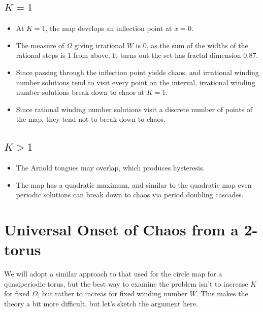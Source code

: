 \documentclass[12pt]{article}
\begin{document}
\subsection{$K = 1$}

\begin{itemize}
    \item At $K = 1$, the map develops an inflection point at $x=0$.

    \item The measure of $\Omega$ giving irrational $W$ is $0$, as the sum of
        the widths of the rational steps is $1$ from above. It turns out the set
        has fractal dimension $0.87$.

    \item Since passing through the inflection point yields chaos, and
        irrational winding number solutions tend to visit every point on the
        interval, irrational winding number solutions break down to chaos at
        $K=1$.

    \item Since rational winding number solutions visit a discrete number of
        points of the map, they tend not to break down to chaos.
\end{itemize}

\subsection{$K > 1$}

\begin{itemize}
    \item The Arnold tongues may overlap, which produces hysteresis.

    \item The map has a quadratic maximum, and similar to the quadratic map even
        periodic solutions can break down to chaos via period doubling cascades.
\end{itemize}

\clearpage

\section{Universal Onset of Chaos from a 2-torus}

We will adopt a similar approach to that used for the circle map for a
quasiperiodic torus, but the best way to examine the problem isn't to increase
$K$ for fixed $\Omega$, but rather to increas for fixed winding number $W$. This
makes the theory a bit more difficult, but let's sketch the argument here.
\end{document}
